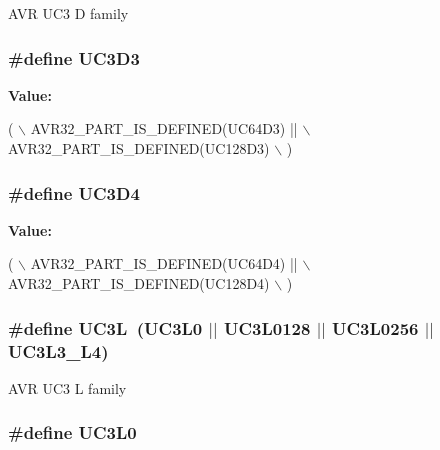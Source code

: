 A\-V\-R U\-C3 D family \hypertarget{group__uc3__part__macros__group_ga432af70c4d53fc917770e4ce48440613}{
\subsubsection[{U\-C3\-D3}]{\setlength{\rightskip}{0pt plus 5cm}\#define U\-C3\-D3}}\label{group__uc3__part__macros__group_ga432af70c4d53fc917770e4ce48440613}
{\bfseries Value\-:}
\begin{DoxyCode}
(   \(\backslash\)
        AVR32\_PART\_IS\_DEFINED(UC64D3)  || \(\backslash\)
        AVR32\_PART\_IS\_DEFINED(UC128D3) \(\backslash\)
        )
\end{DoxyCode}
\hypertarget{group__uc3__part__macros__group_gae271cf5f4b9459baea7216c071e02d76}{
\subsubsection[{U\-C3\-D4}]{\setlength{\rightskip}{0pt plus 5cm}\#define U\-C3\-D4}}\label{group__uc3__part__macros__group_gae271cf5f4b9459baea7216c071e02d76}
{\bfseries Value\-:}
\begin{DoxyCode}
(   \(\backslash\)
        AVR32\_PART\_IS\_DEFINED(UC64D4)  || \(\backslash\)
        AVR32\_PART\_IS\_DEFINED(UC128D4) \(\backslash\)
        )
\end{DoxyCode}
\hypertarget{group__uc3__part__macros__group_gac8a7d715e500aa74cd05e0f0fc5bb005}{
\subsubsection[{U\-C3\-L}]{\setlength{\rightskip}{0pt plus 5cm}\#define U\-C3\-L~({\bf U\-C3\-L0} $|$$|$ {\bf U\-C3\-L0128} $|$$|$ {\bf U\-C3\-L0256} $|$$|$ {\bf U\-C3\-L3\-\_\-\-L4})}}\label{group__uc3__part__macros__group_gac8a7d715e500aa74cd05e0f0fc5bb005}
A\-V\-R U\-C3 L family \hypertarget{group__uc3__part__macros__group_ga4a399e061cd2bf1088c01a22f69cf6c1}{
\subsubsection[{U\-C3\-L0}]{\setlength{\rightskip}{0pt plus 5cm}\#define U\-C3\-L0}}\label{group__uc3__part__macros__group_ga4a399e061cd2bf1088c01a22f69cf6c1}
